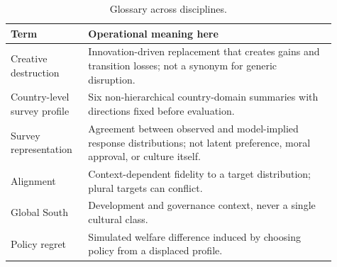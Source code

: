 \begin{table}[!htbp]
\centering
\caption{Glossary across disciplines.}
\small
\begin{tabular}{p{0.21\linewidth}p{0.70\linewidth}}
\toprule
\rowcolor{tablehead}
Term & Operational meaning here \\
\midrule
Creative destruction & Innovation-driven replacement that creates gains and transition losses; not a synonym for generic disruption. \\
Country-level survey profile & Six non-hierarchical country-domain summaries with directions fixed before evaluation. \\
Survey representation & Agreement between observed and model-implied response distributions; not latent preference, moral approval, or culture itself. \\
Alignment & Context-dependent fidelity to a target distribution; plural targets can conflict. \\
Global South & Development and governance context, never a single cultural class. \\
Policy regret & Simulated welfare difference induced by choosing policy from a displaced profile. \\
\bottomrule
\end{tabular}
\end{table}
